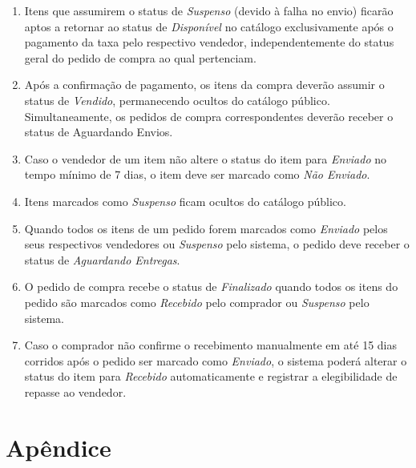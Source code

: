 \documentclass[
	article,			%
	11pt,				%
	oneside,			%
	a4paper,			%
	english,			%
	brazil,				%
	sumario=tradicional
	]{abntex2}
\begin{document}
\begin{enumerate}[label=RD\arabic*:]
    \item Itens que assumirem o status de \textit{Suspenso} (devido à falha no envio) ficarão aptos a retornar ao status de \textit{Disponível} no catálogo exclusivamente após o pagamento da taxa pelo respectivo vendedor, independentemente do status geral do pedido de compra ao qual pertenciam.

    \item Após a confirmação de pagamento, os itens da compra deverão assumir o status de \textit{Vendido}, permanecendo ocultos do catálogo público. Simultaneamente, os pedidos de compra correspondentes deverão receber o status de Aguardando Envios. 

    \item Caso o vendedor de um item não altere o status do item para \textit{Enviado} no tempo mínimo de 7 dias, o item deve ser marcado como \textit{Não Enviado}.

    \item Itens marcados como \textit{Suspenso} ficam ocultos do catálogo público. 

    \item Quando todos os itens de um pedido forem marcados como \textit{Enviado} pelos seus respectivos vendedores ou \textit{Suspenso} pelo sistema, o pedido deve receber o status de \textit{Aguardando Entregas}.

    \item O pedido de compra recebe o status de \textit{Finalizado} quando todos os itens do pedido são marcados como \textit{Recebido} pelo comprador ou \textit{Suspenso} pelo sistema.      

    \item Caso o comprador não confirme o recebimento manualmente em até 15 dias corridos após o pedido ser marcado como \textit{Enviado}, o sistema poderá alterar o status do item para \textit{Recebido} automaticamente e registrar a elegibilidade de repasse ao vendedor.

\end{enumerate}


\clearpage
\section{Apêndice}
\label{Apendice}
\end{document}
